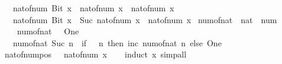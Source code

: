 \begin{isabellebody}
\ \ {\isacharbar}{\kern0pt}\ {\isachardoublequoteopen}nat{\isacharunderscore}{\kern0pt}of{\isacharunderscore}{\kern0pt}num\ {\isacharparenleft}{\kern0pt}Bit{}\ x{\isacharparenright}{\kern0pt}\ {\isacharequal}{\kern0pt}\ nat{\isacharunderscore}{\kern0pt}of{\isacharunderscore}{\kern0pt}num\ x\ {\isacharplus}{\kern0pt}\ nat{\isacharunderscore}{\kern0pt}of{\isacharunderscore}{\kern0pt}num\ x{\isachardoublequoteclose}\isanewline
\ \ {\isacharbar}{\kern0pt}\ {\isachardoublequoteopen}nat{\isacharunderscore}{\kern0pt}of{\isacharunderscore}{\kern0pt}num\ {\isacharparenleft}{\kern0pt}Bit{}\ x{\isacharparenright}{\kern0pt}\ {\isacharequal}{\kern0pt}\ Suc\ {\isacharparenleft}{\kern0pt}nat{\isacharunderscore}{\kern0pt}of{\isacharunderscore}{\kern0pt}num\ x\ {\isacharplus}{\kern0pt}\ nat{\isacharunderscore}{\kern0pt}of{\isacharunderscore}{\kern0pt}num\ x{\isacharparenright}{\kern0pt}{\isachardoublequoteclose}\isanewline
\isanewline
{}\isamarkupfalse%
\ num{\isacharunderscore}{\kern0pt}of{\isacharunderscore}{\kern0pt}nat\ {\isacharcolon}{\kern0pt}{\isacharcolon}{\kern0pt}\ {\isachardoublequoteopen}nat\ {\isasymRightarrow}\ num{\isachardoublequoteclose}\isanewline
\ \ \isanewline
\ \ \ \ {\isachardoublequoteopen}num{\isacharunderscore}{\kern0pt}of{\isacharunderscore}{\kern0pt}nat\ {}\ {\isacharequal}{\kern0pt}\ One{\isachardoublequoteclose}\isanewline
\ \ {\isacharbar}{\kern0pt}\ {\isachardoublequoteopen}num{\isacharunderscore}{\kern0pt}of{\isacharunderscore}{\kern0pt}nat\ {\isacharparenleft}{\kern0pt}Suc\ n{\isacharparenright}{\kern0pt}\ {\isacharequal}{\kern0pt}\ {\isacharparenleft}{\kern0pt}if\ {}\ {\isacharless}{\kern0pt}\ n\ then\ inc\ {\isacharparenleft}{\kern0pt}num{\isacharunderscore}{\kern0pt}of{\isacharunderscore}{\kern0pt}nat\ n{\isacharparenright}{\kern0pt}\ else\ One{\isacharparenright}{\kern0pt}{\isachardoublequoteclose}\isanewline
\isanewline
{}\isamarkupfalse%
\ nat{\isacharunderscore}{\kern0pt}of{\isacharunderscore}{\kern0pt}num{\isacharunderscore}{\kern0pt}pos{\isacharcolon}{\kern0pt}\ {\isachardoublequoteopen}{}\ {\isacharless}{\kern0pt}\ nat{\isacharunderscore}{\kern0pt}of{\isacharunderscore}{\kern0pt}num\ x{\isachardoublequoteclose}\isanewline
%
\isadelimproof
\ \ %
\endisadelimproof
%
\isatagproof
{}\isamarkupfalse%
\ {\isacharparenleft}{\kern0pt}induct\ x{\isacharparenright}{\kern0pt}\ simp{\isacharunderscore}{\kern0pt}all%
\endisatagproof
{\isafoldproof}%
%
\isadelimproof
\isanewline
%
\endisadelimproof
\isanewline
{}\isamarkupfalse%

\end{isabellebody}

